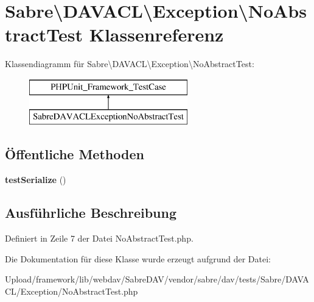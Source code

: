 \hypertarget{class_sabre_1_1_d_a_v_a_c_l_1_1_exception_1_1_no_abstract_test}{}\section{Sabre\textbackslash{}D\+A\+V\+A\+CL\textbackslash{}Exception\textbackslash{}No\+Abstract\+Test Klassenreferenz}
\label{class_sabre_1_1_d_a_v_a_c_l_1_1_exception_1_1_no_abstract_test}
Klassendiagramm für Sabre\textbackslash{}D\+A\+V\+A\+CL\textbackslash{}Exception\textbackslash{}No\+Abstract\+Test\+:\begin{figure}[H]
\begin{center}
\leavevmode
\includegraphics[height=2.000000cm]{class_sabre_1_1_d_a_v_a_c_l_1_1_exception_1_1_no_abstract_test}
\end{center}
\end{figure}
\subsection*{Öffentliche Methoden}
\begin{DoxyCompactItemize}
\item 
\mbox{\label{class_sabre_1_1_d_a_v_a_c_l_1_1_exception_1_1_no_abstract_test_a4ecf9c51d89d106e4b16c55f2dfaddfb}} 
{\bfseries test\+Serialize} ()
\end{DoxyCompactItemize}


\subsection{Ausführliche Beschreibung}


Definiert in Zeile 7 der Datei No\+Abstract\+Test.\+php.



Die Dokumentation für diese Klasse wurde erzeugt aufgrund der Datei\+:\begin{DoxyCompactItemize}
\item 
Upload/framework/lib/webdav/\+Sabre\+D\+A\+V/vendor/sabre/dav/tests/\+Sabre/\+D\+A\+V\+A\+C\+L/\+Exception/No\+Abstract\+Test.\+php\end{DoxyCompactItemize}
